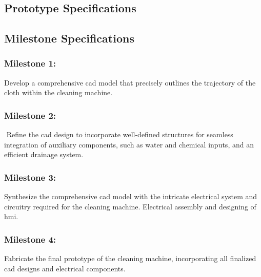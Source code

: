 \documentclass[12pt]{article} %
\begin{document}
\subsection{Prototype Specifications}

\subsection{Milestone Specifications}
    \subsubsection{Milestone 1:} Develop a comprehensive \gls{cad} model that precisely outlines the trajectory of the cloth within the cleaning machine.
    \subsubsection{Milestone 2:}⁠ Refine the \acrshort{cad} design to incorporate well-defined structures for seamless integration of auxiliary components, such as water and chemical inputs, and an efficient drainage system.
    \subsubsection{Milestone 3:} Synthesize the comprehensive \acrshort{cad} model with the intricate electrical system and circuitry required for the cleaning machine. Electrical assembly and designing of \acrshort{hmi}.
    \subsubsection{Milestone 4:} Fabricate the final prototype of the cleaning machine, incorporating all finalized \acrshort{cad} designs and electrical components.

\newpage

\begingroup
\let\oldthesection\thesection
\addtocounter{section}{+1}
\let\thesection\oldthesection 
\endgroup



\newpage
\section*{}
\printglossary[type=\acronymtype]

\newpage
\end{document}
